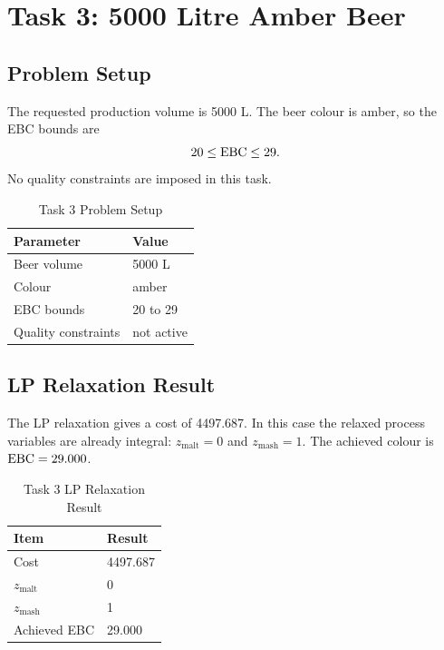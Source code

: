 \section{Task 3: 5000 Litre Amber Beer}
\label{sec:task3}

\subsection{Problem Setup}
\label{sec:task3-setup}
The requested production volume is 5000 L. The beer colour is amber, so the EBC bounds are
\[
20 \leq \mathrm{EBC} \leq 29.
\]
No quality constraints are imposed in this task.

\begin{table}[!t]
\renewcommand{\arraystretch}{1.15}
\caption{Task 3 Problem Setup}
\label{tab:task33-setup}
\centering
\small
\begin{tabular}{@{}ll@{}}
\toprule
Parameter & Value \\
\midrule
Beer volume & 5000 L \\
Colour & amber \\
EBC bounds & 20 to 29 \\
Quality constraints & not active \\
\bottomrule
\end{tabular}
\end{table}

\subsection{LP Relaxation Result}
\label{sec:task3-relaxation}
The LP relaxation gives a cost of 4497.687. In this case the relaxed process variables are already integral: $z_{\mathrm{malt}}=0$ and $z_{\mathrm{mash}}=1$. The achieved colour is $\mathrm{EBC}=29.000$.

\begin{table}[!t]
\renewcommand{\arraystretch}{1.15}
\caption{Task 3 LP Relaxation Result}
\label{tab:task33-relaxation}
\centering
\small
\begin{tabular}{@{}ll@{}}
\toprule
Item & Result \\
\midrule
Cost & 4497.687 \\
$z_{\mathrm{malt}}$ & 0 \\
$z_{\mathrm{mash}}$ & 1 \\
Achieved EBC & 29.000 \\
\bottomrule
\end{tabular}
\end{table}

